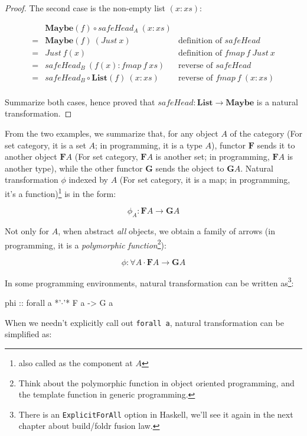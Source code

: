 \documentclass[b5paper]{article}
\begin{document}
\begin{example}
\begin{proof}
The second case is the non-empty list $(x:xs)$:

\[
\begin{array}{cll}
  & \mathbf{Maybe}(f) \circ safeHead_A\ (x:xs) & \\
= & \mathbf{Maybe}(f)\ (Just\ x) & \text{definition of $safeHead$} \\
= & Just\ f(x) & \text{definition of $fmap\ f\ Just\ x$} \\
= & safeHead_B\ (f(x) : fmap\ f\ xs) & \text{reverse of $safeHead$} \\
= & safeHead_B \circ \mathbf{List}(f)\ (x:xs) & \text{reverse of $fmap\ f\ (x:xs)$} \\
\end{array}
\]

Summarize both cases, hence proved that $safeHead : \mathbf{List} \to \mathbf{Maybe}$ is a natural transformation.
\end{proof}
\end{example}

From the two examples, we summarize that, for any object $A$ of the category (For set category, it is a set $A$; in programming, it is a type $A$), functor $\mathbf{F}$ sends it to another object $\mathbf{F}A$ (For set category, $\mathbf{F}A$ is another set; in programming, $\mathbf{F}A$ is another type), while the other functor $\mathbf{G}$ sends the object to $\mathbf{G}A$. Natural transformation $\phi$ indexed by $A$ (For set category, it is a map; in programming, it's a function)\footnote{also called as the component at $A$} is in the form:

\[
\phi_A : \mathbf{F} A \to \mathbf{G} A
\]

Not only for $A$, when abstract {\em all} objects, we obtain a family of arrows (in programming, it is a {\em polymorphic function}\footnote{Think about the polymorphic function in object oriented programming, and the template function in generic programming.}):

\[
\phi : \forall A \cdot \mathbf{F} A \to \mathbf{G} A
\]

In some programming environments, natural transformation can be written as\footnote{There is an \texttt{ExplicitForAll} option in Haskell, we'll see it again in the next chapter about build/foldr fusion law.}:

\lstset{frame=single}
\begin{Haskell}
phi :: forall a *'$\cdot$'* F a -> G a
\end{Haskell}

When we needn't explicitly call out \texttt{forall a}, natural transformation can be simplified as:
\end{document}
